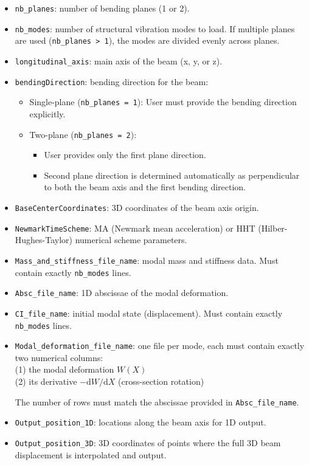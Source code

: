 \begin{itemize}
  \item \texttt{nb\_planes}: number of bending planes (1 or 2).
  \item \texttt{nb\_modes}: number of structural vibration modes to load.  If multiple planes are used (\texttt{nb\_planes > 1}),  the modes are divided evenly across planes. 
  \item \texttt{longitudinal\_axis}: main axis of the beam (x, y, or z).
  \item \texttt{bendingDirection}: bending direction for the beam:
\begin{itemize}
    \item Single-plane (\texttt{nb\_planes = 1}): User must provide the bending direction explicitly.
    \item Two-plane (\texttt{nb\_planes = 2}): 
        \begin{itemize}
            \item User provides only the first plane direction.
            \item Second plane direction is determined automatically as perpendicular to both the beam axis and the first bending direction.
        \end{itemize}
\end{itemize}
  \item \texttt{BaseCenterCoordinates}: 3D coordinates of the beam axis origin.
  \item \texttt{NewmarkTimeScheme}: MA (Newmark mean acceleration) or HHT (Hilber-Hughes-Taylor) numerical scheme parameters.
  \item \texttt{Mass\_and\_stiffness\_file\_name}: modal mass and stiffness data. Must contain exactly \texttt{nb\_modes} lines.
  \item \texttt{Absc\_file\_name}: 1D abscissae of the modal deformation.
  \item \texttt{CI\_file\_name}: initial modal state (displacement). Must contain exactly \texttt{nb\_modes} lines.
  \item \texttt{Modal\_deformation\_file\_name}: one file per mode, each must contain exactly two numerical columns:\\
        \quad (1) the modal deformation \(W(X)\)\\
        \quad (2) its derivative \(-\mathrm{d}W/\mathrm{d}X\) (cross-section rotation)

The number of rows must match the abscissae provided in \texttt{Absc\_file\_name}.

  \item \texttt{Output\_position\_1D}: locations along the beam axis for 1D output.
  \item \texttt{Output\_position\_3D}: 3D coordinates of points where the full
        3D beam displacement is interpolated and output.
\end{itemize}



